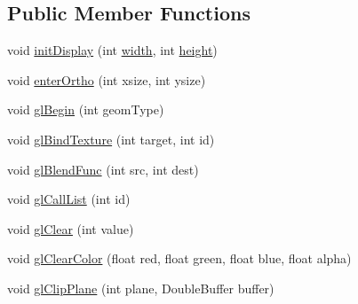 \subsection*{Public Member Functions}
\begin{DoxyCompactItemize}
\item 
void \mbox{\hyperlink{classorg_1_1newdawn_1_1slick_1_1opengl_1_1renderer_1_1_immediate_mode_o_g_l_renderer_a05e00bbbf5384585fa1d7c34c8932c6f}{init\+Display}} (int \mbox{\hyperlink{classorg_1_1newdawn_1_1slick_1_1opengl_1_1renderer_1_1_immediate_mode_o_g_l_renderer_a65d0a04d747368ea954f69074d9102d6}{width}}, int \mbox{\hyperlink{classorg_1_1newdawn_1_1slick_1_1opengl_1_1renderer_1_1_immediate_mode_o_g_l_renderer_aec68994a0ee3b7b478122af823c8a8d7}{height}})
\item 
void \mbox{\hyperlink{classorg_1_1newdawn_1_1slick_1_1opengl_1_1renderer_1_1_immediate_mode_o_g_l_renderer_a80452e864cb2656b20684c65dc219014}{enter\+Ortho}} (int xsize, int ysize)
\item 
void \mbox{\hyperlink{classorg_1_1newdawn_1_1slick_1_1opengl_1_1renderer_1_1_immediate_mode_o_g_l_renderer_a284c45b331dcb985b62dc903dddc9a37}{gl\+Begin}} (int geom\+Type)
\item 
void \mbox{\hyperlink{classorg_1_1newdawn_1_1slick_1_1opengl_1_1renderer_1_1_immediate_mode_o_g_l_renderer_a5887392f19764461545bcdb31b6b48b0}{gl\+Bind\+Texture}} (int target, int id)
\item 
void \mbox{\hyperlink{classorg_1_1newdawn_1_1slick_1_1opengl_1_1renderer_1_1_immediate_mode_o_g_l_renderer_af241eb86655622bc19f902ff4dd2033d}{gl\+Blend\+Func}} (int src, int dest)
\item 
void \mbox{\hyperlink{classorg_1_1newdawn_1_1slick_1_1opengl_1_1renderer_1_1_immediate_mode_o_g_l_renderer_a30770752ebb5e2bbc31f322368dfa46e}{gl\+Call\+List}} (int id)
\item 
void \mbox{\hyperlink{classorg_1_1newdawn_1_1slick_1_1opengl_1_1renderer_1_1_immediate_mode_o_g_l_renderer_afc6e323939ac38f4f55f78cb02e5ad03}{gl\+Clear}} (int value)
\item 
void \mbox{\hyperlink{classorg_1_1newdawn_1_1slick_1_1opengl_1_1renderer_1_1_immediate_mode_o_g_l_renderer_aa0f25ed8bfb71166cba97a83d6d359ce}{gl\+Clear\+Color}} (float red, float green, float blue, float alpha)
\item 
void \mbox{\hyperlink{classorg_1_1newdawn_1_1slick_1_1opengl_1_1renderer_1_1_immediate_mode_o_g_l_renderer_ac015ad8c26e5718b1e27910c8f09673c}{gl\+Clip\+Plane}} (int plane, Double\+Buffer buffer)

\end{DoxyCompactItemize}
